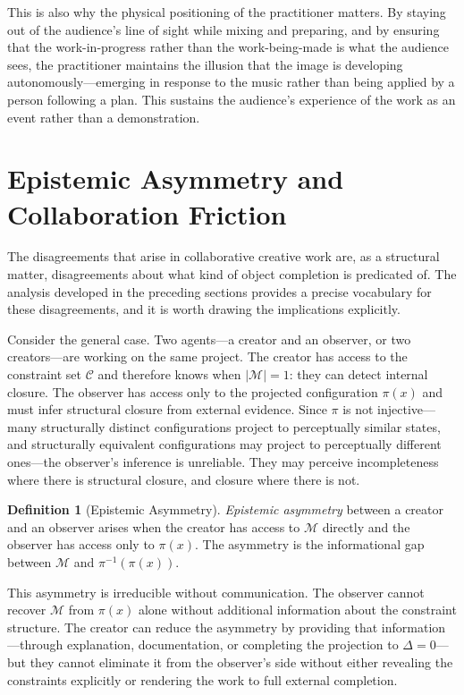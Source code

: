 \documentclass[11pt, twoside]{article}
\theoremstyle{plain}
\theoremstyle{definition}
\newtheorem{definition}[theorem]{Definition}
\theoremstyle{remark}
\begin{document}
This is also why the physical positioning of the practitioner matters. By staying out of the audience's line of sight while mixing and preparing, and by ensuring that the work-in-progress rather than the work-being-made is what the audience sees, the practitioner maintains the illusion that the image is developing autonomously---emerging in response to the music rather than being applied by a person following a plan. This sustains the audience's experience of the work as an event rather than a demonstration.

\section{Epistemic Asymmetry and Collaboration Friction}
\label{sec:asymmetry}

The disagreements that arise in collaborative creative work are, as a structural matter, disagreements about what kind of object completion is predicated of. The analysis developed in the preceding sections provides a precise vocabulary for these disagreements, and it is worth drawing the implications explicitly.

Consider the general case. Two agents---a creator and an observer, or two creators---are working on the same project. The creator has access to the constraint set $\mathcal{C}$ and therefore knows when $|\mathcal{M}| = 1$: they can detect internal closure. The observer has access only to the projected configuration $\pi(x)$ and must infer structural closure from external evidence. Since $\pi$ is not injective---many structurally distinct configurations project to perceptually similar states, and structurally equivalent configurations may project to perceptually different ones---the observer's inference is unreliable. They may perceive incompleteness where there is structural closure, and closure where there is not.

\begin{definition}[Epistemic Asymmetry]
\emph{Epistemic asymmetry} between a creator and an observer arises when the creator has access to $\mathcal{M}$ directly and the observer has access only to $\pi(x)$. The asymmetry is the informational gap between $\mathcal{M}$ and $\pi^{-1}(\pi(x))$.
\end{definition}

This asymmetry is irreducible without communication. The observer cannot recover $\mathcal{M}$ from $\pi(x)$ alone without additional information about the constraint structure. The creator can reduce the asymmetry by providing that information---through explanation, documentation, or completing the projection to $\Delta = 0$---but they cannot eliminate it from the observer's side without either revealing the constraints explicitly or rendering the work to full external completion.
\end{document}
